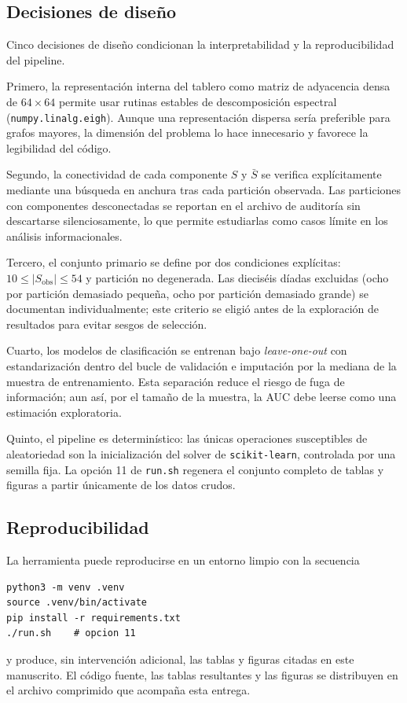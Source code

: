 \documentclass[journal]{IEEEtran}
\newcommand{\Sobs}{S_{\mathrm{obs}}}
\begin{document}
\subsection{Decisiones de diseño}

Cinco decisiones de diseño condicionan la interpretabilidad y la reproducibilidad del pipeline.

Primero, la representación interna del tablero como matriz de adyacencia densa de $64\times 64$ permite usar rutinas estables de descomposición espectral (\texttt{numpy.linalg.eigh}). Aunque una representación dispersa sería preferible para grafos mayores, la dimensión del problema lo hace innecesario y favorece la legibilidad del código.

Segundo, la conectividad de cada componente $S$ y $\bar S$ se verifica explícitamente mediante una búsqueda en anchura tras cada partición observada. Las particiones con componentes desconectadas se reportan en el archivo de auditoría sin descartarse silenciosamente, lo que permite estudiarlas como casos límite en los análisis informacionales.

Tercero, el conjunto primario se define por dos condiciones explícitas: $10 \le |\Sobs| \le 54$ y partición no degenerada. Las dieciséis díadas excluidas (ocho por partición demasiado pequeña, ocho por partición demasiado grande) se documentan individualmente; este criterio se eligió antes de la exploración de resultados para evitar sesgos de selección.

Cuarto, los modelos de clasificación se entrenan bajo \emph{leave-one-out} con estandarización dentro del bucle de validación e imputación por la mediana de la muestra de entrenamiento. Esta separación reduce el riesgo de fuga de información; aun así, por el tamaño de la muestra, la AUC debe leerse como una estimación exploratoria.

Quinto, el pipeline es determinístico: las únicas operaciones susceptibles de aleatoriedad son la inicialización del solver de \texttt{scikit-learn}, controlada por una semilla fija. La opción 11 de \texttt{run.sh} regenera el conjunto completo de tablas y figuras a partir únicamente de los datos crudos.

\subsection{Reproducibilidad}

La herramienta puede reproducirse en un entorno limpio con la secuencia
\begin{verbatim}
python3 -m venv .venv
source .venv/bin/activate
pip install -r requirements.txt
./run.sh    # opcion 11
\end{verbatim}
y produce, sin intervención adicional, las tablas y figuras citadas en este manuscrito. El código fuente, las tablas resultantes y las figuras se distribuyen en el archivo comprimido que acompaña esta entrega.
\end{document}
